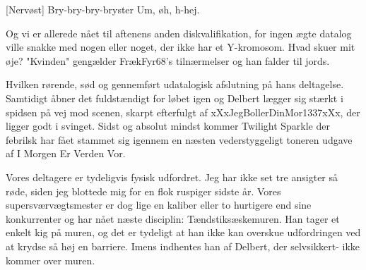 \documentclass[a4paper,11pt]{article}
\begin{document}
\begin{sketch}

[Nervøst] Bry-bry-bry-bryster  Um, øh, h-hej.

 Og vi er allerede nået til aftenens anden diskvalifikation, for ingen ægte datalog ville snakke med nogen eller noget, der ikke har et Y-kromosom. %
Hvad skuer mit øje? "Kvinden" gengælder FrækFyr68's tilnærmelser og han falder til jords.



 Hvilken rørende, sød og gennemført udatalogisk afslutning på hans deltagelse. Samtidigt åbner det fuldstændigt for løbet igen og Delbert lægger sig stærkt i spidsen på vej mod scenen, skarpt efterfulgt af xXxJegBollerDinMor1337xXx, der ligger godt i svinget. Sidst og absolut mindst kommer Twilight Sparkle der febrilsk har fået stammet sig igennem en næsten vederstyggeligt toneren udgave af I Morgen Er Verden Vor. %



 Vores deltagere er tydeligvis fysisk udfordret. Jeg har ikke set tre ansigter så røde, siden jeg blottede mig for en flok ruspiger sidste år. Vores supersværvægtsmester er dog lige en kaliber eller to hurtigere end sine konkurrenter og har nået næste disciplin: Tændstiksæskemuren. Han tager et enkelt kig på muren, og det er tydeligt at han ikke kan overskue udfordringen ved at krydse så høj en barriere.
Imens indhentes han af Delbert, der selvsikkert-  ikke kommer over muren.




\end{sketch}
\end{document}
